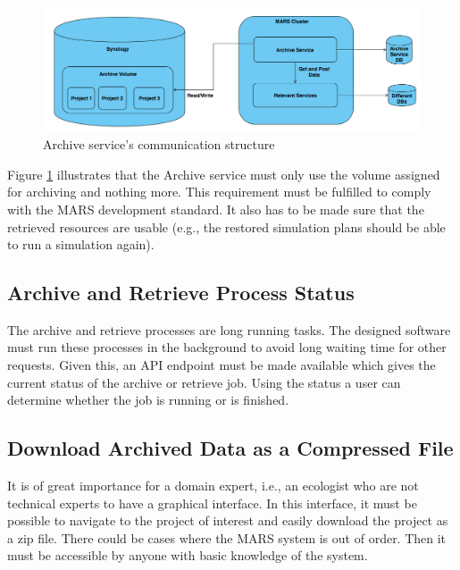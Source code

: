             \begin{figure}[H]
                \centering \includegraphics[scale=0.4]{grafiken/synology.png}
                \caption{Archive service's communication structure}
                \label{fig:synology}
            \end{figure}

            Figure \ref{fig:synology} illustrates that the Archive service must only use the volume assigned for archiving and nothing more. 
            This requirement must be fulfilled to comply with the MARS development standard. It also has to be made sure that the retrieved
            resources are usable (e.g., the restored simulation plans should be able to run a simulation again). 

        \subsection{Archive and Retrieve Process Status}  
            The archive and retrieve processes are long running tasks. The designed software must run these processes in the background to avoid 
            long waiting time for other requests. Given this, an API endpoint must be made available which gives the current status of the archive 
            or retrieve job. Using the status a user can determine whether the job is running or is finished.


        \subsection{Download Archived Data as a Compressed File}
        \label{sec:anaCompress}
            It is of great importance for a domain expert, i.e., an ecologist who are not technical experts to have a graphical interface. In this interface,
            it must be possible to navigate to the project of interest and easily download the project as a zip file. There could be cases where the
            MARS system is out of order. Then it must be accessible by anyone with basic knowledge of the system.
        
